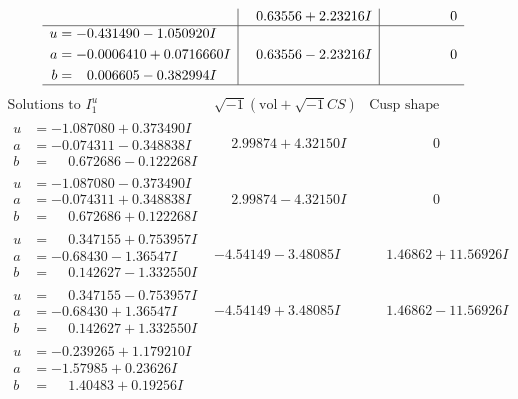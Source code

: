 \documentclass[1p]{elsarticle_modified}
\theoremstyle{definition}
\newcommand{\I}{\sqrt{-1}}
\begin{document}
$$\begin{array}{c|c|c}
 & \phantom{-}0.63556 + 2.23216 I & \phantom{-0.000000 } 0 \\ \hline\begin{aligned}
u &= -0.431490 - 1.050920 I \\
a &= -0.0006410 + 0.0716660 I \\
b &= \phantom{-}0.006605 - 0.382994 I\end{aligned}
 & \phantom{-}0.63556 - 2.23216 I & \phantom{-0.000000 } 0\\
 \hline 
 \end{array}$$\newpage$$\begin{array}{c|c|c}  
\text{Solutions to }I^u_{1}& \I (\text{vol} + \sqrt{-1}CS) & \text{Cusp shape}\\
 \hline 
\begin{aligned}
u &= -1.087080 + 0.373490 I \\
a &= -0.074311 - 0.348838 I \\
b &= \phantom{-}0.672686 - 0.122268 I\end{aligned}
 & \phantom{-}2.99874 + 4.32150 I & \phantom{-0.000000 } 0 \\ \hline\begin{aligned}
u &= -1.087080 - 0.373490 I \\
a &= -0.074311 + 0.348838 I \\
b &= \phantom{-}0.672686 + 0.122268 I\end{aligned}
 & \phantom{-}2.99874 - 4.32150 I & \phantom{-0.000000 } 0 \\ \hline\begin{aligned}
u &= \phantom{-}0.347155 + 0.753957 I \\
a &= -0.68430 - 1.36547 I \\
b &= \phantom{-}0.142627 - 1.332550 I\end{aligned}
 & -4.54149 - 3.48085 I & \phantom{-}1.46862 + 11.56926 I \\ \hline\begin{aligned}
u &= \phantom{-}0.347155 - 0.753957 I \\
a &= -0.68430 + 1.36547 I \\
b &= \phantom{-}0.142627 + 1.332550 I\end{aligned}
 & -4.54149 + 3.48085 I & \phantom{-}1.46862 - 11.56926 I \\ \hline\begin{aligned}
u &= -0.239265 + 1.179210 I \\
a &= -1.57985 + 0.23626 I \\
b &= \phantom{-}1.40483 + 0.19256 I\end{aligned}

\end{array}$$
\end{document}
